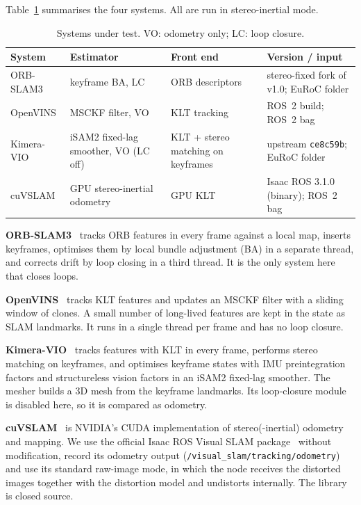 \documentclass[conference,a4paper]{IEEEtran}
\begin{document}
Table~\ref{tab:systems} summarises the four systems. All are run in stereo-inertial mode.

\begin{table}[t]
\centering
\caption{Systems under test. VO: odometry only; LC: loop closure.}
\label{tab:systems}
\setlength{\tabcolsep}{3pt}
\footnotesize
\begin{tabular}{@{}l>{\raggedright}p{1.85cm}>{\raggedright}p{1.7cm}>{\raggedright\arraybackslash}p{2.6cm}@{}}
\toprule
System & Estimator & Front end & Version / input \\
\midrule
ORB-SLAM3 & keyframe BA, LC & ORB descriptors & stereo-fixed fork of v1.0; EuRoC folder \\
OpenVINS & MSCKF filter, VO & KLT tracking & ROS~2 build; ROS~2 bag \\
Kimera-VIO & iSAM2 fixed-lag smoother, VO (LC off) & KLT + stereo matching on keyframes & upstream \texttt{ce8c59b}; EuRoC folder \\
cuVSLAM & GPU stereo-inertial odometry & GPU KLT & Isaac ROS 3.1.0 (binary); ROS~2 bag \\
\bottomrule
\end{tabular}
\end{table}

\textbf{ORB-SLAM3}~\cite{orbslam3} tracks ORB features in every frame against a local map, inserts
keyframes, optimises them by local bundle adjustment (BA) in a separate thread, and corrects drift
by loop closing in a third thread. It is the only system here that closes loops.

\textbf{OpenVINS}~\cite{openvins} tracks KLT features and updates an MSCKF filter with a sliding
window of clones. A small number of long-lived features are kept in the state as SLAM landmarks.
It runs in a single thread per frame and has no loop closure.

\textbf{Kimera-VIO}~\cite{kimeravio} tracks features with KLT in every frame, performs stereo
matching on keyframes, and optimises keyframe states with IMU preintegration factors and
structureless vision factors in an iSAM2 fixed-lag smoother. The mesher builds a 3D mesh from
the keyframe landmarks. Its loop-closure module is disabled here, so it is compared as odometry.

\textbf{cuVSLAM}~\cite{korovko2025cuvslam} is NVIDIA's CUDA implementation of stereo(-inertial)
odometry and mapping. We use the official Isaac ROS Visual SLAM package~\cite{cuvslam} without
modification, record its odometry output (\texttt{/visual\_slam/tracking/odometry}) and use its
standard raw-image mode, in which the node receives the distorted images together with the
distortion model and undistorts internally. The library is closed source.
\end{document}
